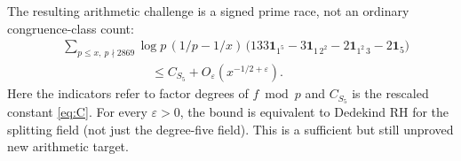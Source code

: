 \documentclass[11pt]{article}
\theoremstyle{remark}\newtheorem{remark}[theorem]{Remark}
\newcommand{\one}{\mathbf{1}}
\begin{document}
The resulting arithmetic challenge is a signed prime race, not an ordinary congruence-class count:
\begin{equation}\label{eq:s5}
 \begin{split}
 &\sum_{p\le x,\ p\nmid2869}\! \log p\,(1/p-1/x)\,
 \big(133\one_{1^5}-3\one_{1\,2^2}-2\one_{1^2\,3}-2\one_{5}\big)\\
 &\hspace{3cm}\le C_{S_5}+O_\varepsilon(x^{-1/2+\varepsilon}).
 \end{split}
\end{equation}
Here the indicators refer to factor degrees of $f\bmod p$ and $C_{S_5}$ is the rescaled constant \eqref{eq:C}. For every $\varepsilon>0$, the bound is equivalent to Dedekind RH for the splitting field (not just the degree-five field). This is a sufficient but still unproved new arithmetic target.
\end{document}
